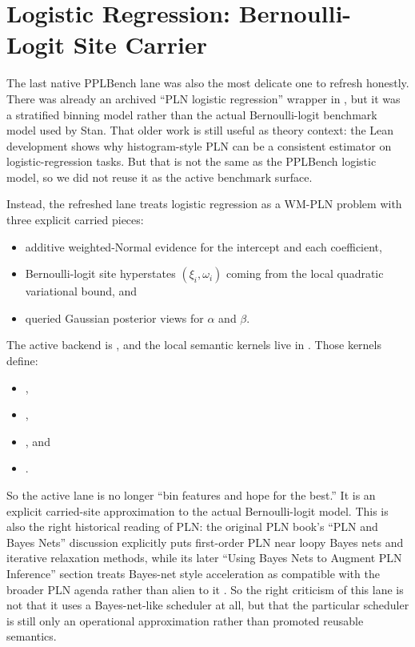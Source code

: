 \documentclass[11pt,openany]{report}
\begin{document}
\section{Logistic Regression: Bernoulli-Logit Site Carrier}
\label{app:pplbench-logistic-regression}

The last native PPLBench lane was also the most delicate one to refresh
honestly.  There was already an archived ``PLN logistic regression'' wrapper in
, but it was a
stratified binning model rather than the actual Bernoulli-logit benchmark model
used by Stan.  That older work is still useful as theory context: the Lean
 development shows why histogram-style PLN can be a
consistent estimator on logistic-regression tasks.  But that is not the same as
the PPLBench logistic model, so we did not reuse it as the active benchmark
surface.

Instead, the refreshed lane treats logistic regression as a WM-PLN problem with
three explicit carried pieces:
\begin{itemize}
\item additive weighted-Normal evidence for the intercept and each coefficient,
\item Bernoulli-logit site hyperstates \((\xi_i, \omega_i)\) coming from the
local quadratic variational bound, and
\item queried Gaussian posterior views for \(\alpha\) and \(\beta\).
\end{itemize}
The active backend is
, and the local semantic
kernels live in
.
Those kernels define:
\begin{itemize}
\item {},
\item {},
\item {}, and
\item {}.
\end{itemize}
So the active lane is no longer ``bin features and hope for the best.''  It is
an explicit carried-site approximation to the actual Bernoulli-logit model.
This is also the right historical reading of PLN: the original PLN book's
``PLN and Bayes Nets'' discussion explicitly puts first-order PLN near loopy
Bayes nets and iterative relaxation methods, while its later ``Using Bayes
Nets to Augment PLN Inference'' section treats Bayes-net style acceleration as
compatible with the broader PLN agenda rather than alien to it
\cite[Sec.~1.6.3]{goertzel2009pln}\cite[Sec.~9.4]{goertzel2009pln}.  So the
right criticism of this lane is not that it uses a Bayes-net-like scheduler at
all, but that the particular scheduler is still only an operational
approximation rather than promoted reusable semantics.
\end{document}

